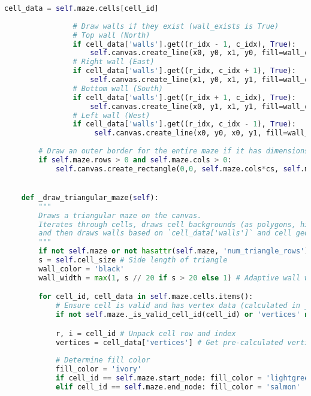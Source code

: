 \documentclass[UTF8]{report}
\theoremstyle{MyLineTheoremStyle} %
\theoremstyle{MyBlockTheoremStyle} %
\theoremstyle{MySubsubsectionStyle} %
\begin{document}
\begin{lstlisting}[language=Python, caption={迷宫生成与求解程序代码}]
                cell_data = self.maze.cells[cell_id]
                
                # Draw walls if they exist (wall_exists is True)
                # Top wall (North)
                if cell_data['walls'].get((r_idx - 1, c_idx), True): 
                    self.canvas.create_line(x0, y0, x1, y0, fill=wall_color, width=wall_width)
                # Right wall (East)
                if cell_data['walls'].get((r_idx, c_idx + 1), True):
                    self.canvas.create_line(x1, y0, x1, y1, fill=wall_color, width=wall_width)
                # Bottom wall (South)
                if cell_data['walls'].get((r_idx + 1, c_idx), True):
                    self.canvas.create_line(x0, y1, x1, y1, fill=wall_color, width=wall_width)
                # Left wall (West)
                if cell_data['walls'].get((r_idx, c_idx - 1), True):
                     self.canvas.create_line(x0, y0, x0, y1, fill=wall_color, width=wall_width)
        
        # Draw an outer border for the entire maze if it has dimensions
        if self.maze.rows > 0 and self.maze.cols > 0: 
            self.canvas.create_rectangle(0,0, self.maze.cols*cs, self.maze.rows*cs, outline='black', width=wall_width)


    def _draw_triangular_maze(self):
        """
        Draws a triangular maze on the canvas.
        Iterates through cells, draws cell backgrounds (as polygons, highlighting start/end),
        and then draws walls based on `cell_data['walls']` and cell geometry.
        """
        if not self.maze or not hasattr(self.maze, 'num_triangle_rows') or self.maze.num_triangle_rows == 0: return
        s = self.cell_size # Side length of triangle
        wall_color = 'black'
        wall_width = max(1, s // 20 if s > 20 else 1) # Adaptive wall width

        for cell_id, cell_data in self.maze.cells.items():
            # Ensure cell is valid and has vertex data (calculated in _update_canvas_size_and_coords)
            if not self.maze._is_valid_cell_id(cell_id) or 'vertices' not in cell_data: continue 

            r, i = cell_id # Unpack cell row and index
            vertices = cell_data['vertices'] # Get pre-calculated vertices
            
            # Determine fill color
            fill_color = 'ivory'
            if cell_id == self.maze.start_node: fill_color = 'lightgreen'
            elif cell_id == self.maze.end_node: fill_color = 'salmon'
            

\end{lstlisting}
\end{document}

